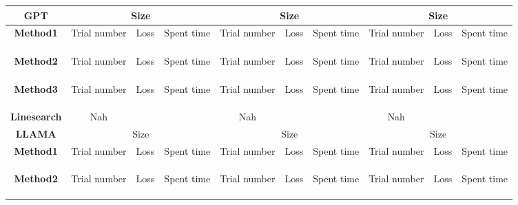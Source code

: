 \begin{table}[htbp]
\centering
\begin{tabular}{c|c|c|c|c|c|c|c|c|c}
\hline
\textbf{GPT}
& \multicolumn{3}{c|}{Size}
& \multicolumn{3}{c|}{Size}
& \multicolumn{3}{c}{Size} \\
\hline

\textbf{Method1}
& Trial number & Loss & Spent time
& Trial number & Loss & Spent time
& Trial number & Loss & Spent time \\
\hline
& & & & & & & & & \\
\hline
& & & & & & & & & \\
\hline
& & & & & & & & & \\
\hline

\textbf{Method2}
& Trial number & Loss & Spent time
& Trial number & Loss & Spent time
& Trial number & Loss & Spent time \\
\hline
& & & & & & & & & \\
\hline
& & & & & & & & & \\
\hline
& & & & & & & & & \\
\hline

\textbf{Method3}
& Trial number & Loss & Spent time
& Trial number & Loss & Spent time
& Trial number & Loss & Spent time \\
\hline
& & & & & & & & & \\
\hline
& & & & & & & & & \\
\hline
& & & & & & & & & \\
\hline

\textbf{Linesearch}
& Nah & & 
& Nah & & 
& Nah & & \\
\hline

\textbf{LLAMA}
& \multicolumn{3}{c|}{Size}
& \multicolumn{3}{c|}{Size}
& \multicolumn{3}{c}{Size} \\
\hline

\textbf{Method1}
& Trial number & Loss & Spent time
& Trial number & Loss & Spent time
& Trial number & Loss & Spent time \\
\hline
& & & & & & & & & \\
\hline
& & & & & & & & & \\
\hline
& & & & & & & & & \\
\hline

\textbf{Method2}
& Trial number & Loss & Spent time
& Trial number & Loss & Spent time
& Trial number & Loss & Spent time \\
\hline
& & & & & & & & & \\
\hline
& & & & & & & & & \\
\hline
& & & & & & & & & \\
\hline


\end{tabular}
\end{table}
